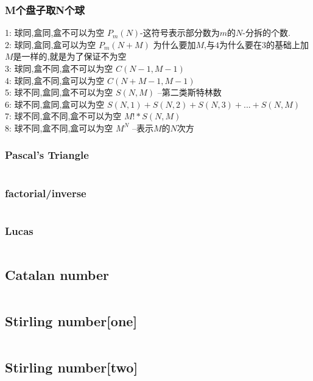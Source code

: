 \documentclass[a4paper,10pt]{article}
\begin{document}
                \subsubsection{M个盘子取N个球}
                    1: 球同,盒同,盒不可以为空   $P_m(N)$-这符号表示部分数为$m$的$N$-分拆的个数. \\
                    2: 球同,盒同,盒可以为空     $P_m(N+M)$ 为什么要加$M$,与$4$为什么要在$3$的基础上加$M$是一样的,就是为了保证不为空        \\
                    3: 球同,盒不同,盒不可以为空 $C(N-1, M-1)$ \\
                    4: 球同,盒不同,盒可以为空   $C(N+M-1, M-1)$ \\
                    5: 球不同,盒同,盒不可以为空 $S(N, M)$ --第二类斯特林数\\
                    6: 球不同,盒同,盒可以为空   $S(N,1) + S(N, 2) + S(N, 3) + ... + S(N, M)$\\
                    7: 球不同,盒不同,盒不可以为空 $ M! * S(N, M)$\\
                    8: 球不同,盒不同,盒可以为空 $M^N$  --表示$M$的$N$次方\\
				\subsubsection{Pascal's Triangle}
					\inputminted[breaklines]{c++}{Math/Pascal-Triangle.cc}
				\subsubsection{factorial/inverse}
					\inputminted[breaklines]{c++}{Math/C(n,m).cc}
				\subsubsection{Lucas}
					\inputminted[breaklines]{c++}{Math/lucas.cc}
			
			\subsection{Catalan number}
				\inputminted[breaklines]{c++}{Math/Catalan.cc}
			\subsection{Stirling number[one]}
				\inputminted[breaklines]{c++}{Math/Stirling-number-one.cc}
			\subsection{Stirling number[two]}
				\inputminted[breaklines]{c++}{Math/Stirling-number-two.cc}
\end{document}
